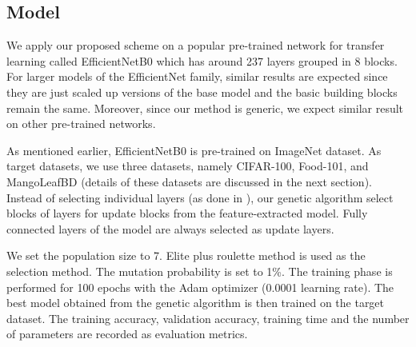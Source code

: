 \documentclass[a4paper,fleqn]{cas-sc}
\begin{document}
\subsection{Model}
We apply our proposed scheme on a popular pre-trained network for transfer learning called EfficientNetB0 which has around 237 layers grouped in 8 blocks. For larger models of the EfficientNet family, similar results are expected since they are just scaled up versions of the base model and the basic building blocks remain the same. Moreover, since our method is generic, we expect similar result on other pre-trained networks.

As mentioned earlier, EfficientNetB0 is pre-trained on ImageNet dataset. As target datasets, we use three datasets, namely CIFAR-100, Food-101, and MangoLeafBD (details of these datasets are discussed in the next section). %
Instead of selecting individual layers (as done in \cite{Nagae2022}), our genetic algorithm select blocks of layers for update blocks from the feature-extracted model. Fully connected layers of the model are always selected as update layers.

We set the population size to 7. Elite plus roulette method is used as the selection method. The mutation probability is set to 1\%.
The training phase is performed  for 100 epochs with the Adam optimizer (0.0001 learning rate). The best model obtained from the genetic algorithm is then trained on the target dataset. The training accuracy, validation accuracy, training time and the number of parameters are recorded as evaluation metrics.

\end{document}

